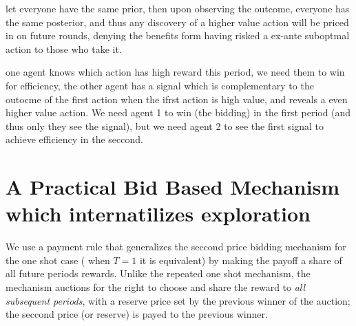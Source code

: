 \begin{eg}
let everyone have the same prior, then upon observing the outcome, everyone has the same posterior, and thus any discovery of a higher value action will be priced in on future rounds, denying the benefits form having risked a ex-ante suboptmal action to those who take it. 
\end{eg}

\begin{eg}
one agent knows which action has high reward this period, we need them to win for efficiency, the other agent has a signal which is complementary to the outocme of the first action when the ifrst action is high value, and reveals a even higher value action. We need agent 1 to win (the bidding) in the first period (and thus only they see the signal), but we need agent 2 to see the first signal to achieve efficiency in the seccond.
\end{eg}




\section{A Practical Bid Based Mechanism which internatilizes exploration}


We use a payment rule that generalizes the seccond price bidding mechanism for the one shot case ( when $T=1$ it is equivalent) by making the payoff a share of all future periods rewards.  Unlike the repeated one shot mechanism, the mechanism auctions for the right to choose and  share the reward to \emph{all subsequent periods}, with a reserve price set by the previous winner of the auction; the seccond price (or reserve) is payed to the previous winner.  


